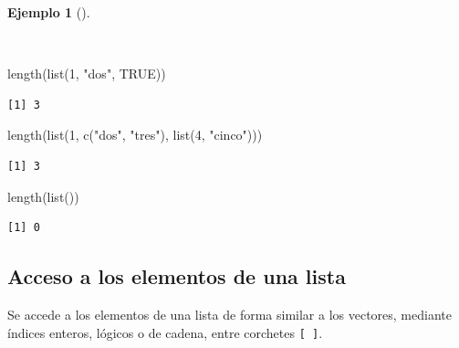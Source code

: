 \documentclass[
  a4paper,
]{scrreport}
\newenvironment{Shaded}{\begin{snugshade}}{\end{snugshade}}
\newcommand{\ConstantTok}[1]{\textcolor[rgb]{0.56,0.35,0.01}{#1}}
\newcommand{\DecValTok}[1]{\textcolor[rgb]{0.68,0.00,0.00}{#1}}
\newcommand{\FunctionTok}[1]{\textcolor[rgb]{0.28,0.35,0.67}{#1}}
\newcommand{\NormalTok}[1]{\textcolor[rgb]{0.00,0.23,0.31}{#1}}
\newcommand{\StringTok}[1]{\textcolor[rgb]{0.13,0.47,0.30}{#1}}
\theoremstyle{definition}
\theoremstyle{definition}
\newtheorem{example}{Ejemplo}[chapter]
\theoremstyle{remark}
\begin{document}
\begin{example}[]\protect\hypertarget{exm-tamaño-lista}{}\label{exm-tamaño-lista}

~

\begin{Shaded}
\begin{Highlighting}[]
\FunctionTok{length}\NormalTok{(}\FunctionTok{list}\NormalTok{(}\DecValTok{1}\NormalTok{, }\StringTok{"dos"}\NormalTok{, }\ConstantTok{TRUE}\NormalTok{))}
\end{Highlighting}
\end{Shaded}

\begin{verbatim}
[1] 3
\end{verbatim}

\begin{Shaded}
\begin{Highlighting}[]
\FunctionTok{length}\NormalTok{(}\FunctionTok{list}\NormalTok{(}\DecValTok{1}\NormalTok{, }\FunctionTok{c}\NormalTok{(}\StringTok{"dos"}\NormalTok{, }\StringTok{"tres"}\NormalTok{), }\FunctionTok{list}\NormalTok{(}\DecValTok{4}\NormalTok{, }\StringTok{"cinco"}\NormalTok{)))}
\end{Highlighting}
\end{Shaded}

\begin{verbatim}
[1] 3
\end{verbatim}

\begin{Shaded}
\begin{Highlighting}[]
\FunctionTok{length}\NormalTok{(}\FunctionTok{list}\NormalTok{())}
\end{Highlighting}
\end{Shaded}

\begin{verbatim}
[1] 0
\end{verbatim}

\end{example}

\hypertarget{acceso-a-los-elementos-de-una-lista}{%
\subsection{Acceso a los elementos de una
lista}\label{acceso-a-los-elementos-de-una-lista}}

Se accede a los elementos de una lista de forma similar a los vectores,
mediante índices enteros, lógicos o de cadena, entre corchetes
\texttt{{[}\ {]}}.
\end{document}
